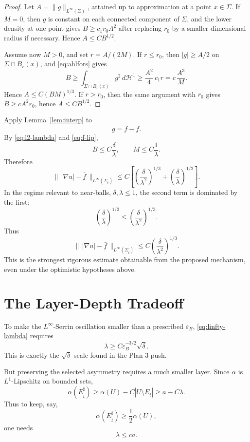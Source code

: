 \documentclass[11pt]{article}
\begin{document}
\begin{proof}
Let \(A=\|g\|_{L^\infty(\Sigma)}\), attained up to approximation at a point
\(x\in\Sigma\).  If \(M=0\), then \(g\) is constant on each connected
component of \(\Sigma\), and the lower density at one point gives
\(B\ge c_1r_0 A^2\) after replacing \(r_0\) by a smaller dimensional radius
if necessary.  Hence \(A\le C B^{1/2}\).

Assume now \(M>0\), and set \(r=A/(2M)\).  If \(r\le r_0\), then
\(|g|\ge A/2\) on \(\Sigma\cap B_r(x)\), and \eqref{eq:ahlfors} gives
\[
   B\ge \int_{\Sigma\cap B_r(x)}g^2\,d\mathcal H^1
      \ge \frac{A^2}{4}\,c_1 r
      =
      c\,\frac{A^3}{M}.
\]
Hence \(A\le C(BM)^{1/3}\).  If \(r>r_0\), then the same argument with
\(r_0\) gives \(B\ge cA^2r_0\), hence \(A\le C B^{1/2}\).
\end{proof}

Apply Lemma~\ref{lem:interp} to
\[
   g=f-\bar f.
\]
By \eqref{eq:l2-lambda} and \eqref{eq:f-lip},
\[
   B\le C\frac{\delta}{\lambda},
   \qquad
   M\le C\frac1\lambda.
\]
Therefore
\[
   \|\,|\nabla u|-\bar f\,\|_{L^\infty(\Sigma_{\hat t})}
      \le
      C\left[
        \left(\frac{\delta}{\lambda^2}\right)^{1/3}
        +\left(\frac{\delta}{\lambda}\right)^{1/2}
      \right].
   \tag{6.1a}\label{eq:linfty-lambda-full}
\]
In the regime relevant to near-balls, \(\delta,\lambda\le1\), the second
term is dominated by the first:
\[
   \left(\frac{\delta}{\lambda}\right)^{1/2}
      \le
   \left(\frac{\delta}{\lambda^2}\right)^{1/3}.
\]
Thus
\[
   \|\,|\nabla u|-\bar f\,\|_{L^\infty(\Sigma_{\hat t})}
      \le
      C\left(\frac{\delta}{\lambda^2}\right)^{1/3}.
   \tag{6.1b}\label{eq:linfty-lambda}
\]
This is the strongest rigorous estimate obtainable from the proposed
mechanism, even under the optimistic hypotheses above.

\section{The Layer-Depth Tradeoff}

To make the \(L^\infty\)-Serrin oscillation smaller than a prescribed
\(\varepsilon_B\), \eqref{eq:linfty-lambda} requires
\[
   \lambda
      \ge
      C\varepsilon_B^{-3/2}\sqrt{\delta}.
   \tag{7.1}\label{eq:lambda-linf}
\]
This is exactly the \(\sqrt\delta\)-scale found in the Plan 3 push.

But preserving the selected asymmetry requires a much smaller layer.  Since
\(\alpha\) is \(L^1\)-Lipschitz on bounded sets,
\[
   \alpha(E_{\hat t}^{\sharp})
      \ge
      \alpha(U)-C|U\setminus E_{\hat t}|
      \ge
      a-C\lambda.
   \tag{7.2}\label{eq:alpha-layer}
\]
Thus to keep, say,
\[
   \alpha(E_{\hat t}^{\sharp})\ge\frac12\alpha(U),
\]
one needs
\[
   \lambda\le c a.
   \tag{7.3}\label{eq:lambda-alpha}
\]
\end{document}
